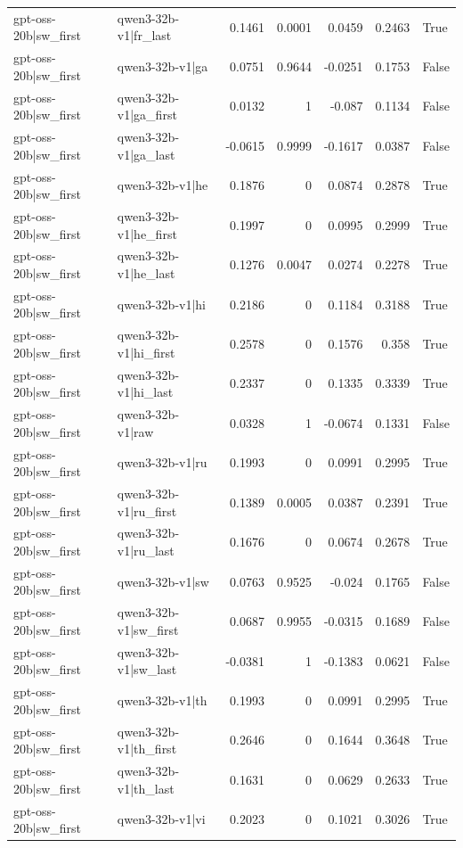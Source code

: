 \begin{table}
\begin{tabular}{l l r r r r l}
gpt-oss-20b|sw_first & qwen3-32b-v1|fr_last & 0.1461 & 0.0001 & 0.0459 & 0.2463 & True \\
gpt-oss-20b|sw_first & qwen3-32b-v1|ga & 0.0751 & 0.9644 & -0.0251 & 0.1753 & False \\
gpt-oss-20b|sw_first & qwen3-32b-v1|ga_first & 0.0132 & 1 & -0.087 & 0.1134 & False \\
gpt-oss-20b|sw_first & qwen3-32b-v1|ga_last & -0.0615 & 0.9999 & -0.1617 & 0.0387 & False \\
gpt-oss-20b|sw_first & qwen3-32b-v1|he & 0.1876 & 0 & 0.0874 & 0.2878 & True \\
gpt-oss-20b|sw_first & qwen3-32b-v1|he_first & 0.1997 & 0 & 0.0995 & 0.2999 & True \\
gpt-oss-20b|sw_first & qwen3-32b-v1|he_last & 0.1276 & 0.0047 & 0.0274 & 0.2278 & True \\
gpt-oss-20b|sw_first & qwen3-32b-v1|hi & 0.2186 & 0 & 0.1184 & 0.3188 & True \\
gpt-oss-20b|sw_first & qwen3-32b-v1|hi_first & 0.2578 & 0 & 0.1576 & 0.358 & True \\
gpt-oss-20b|sw_first & qwen3-32b-v1|hi_last & 0.2337 & 0 & 0.1335 & 0.3339 & True \\
gpt-oss-20b|sw_first & qwen3-32b-v1|raw & 0.0328 & 1 & -0.0674 & 0.1331 & False \\
gpt-oss-20b|sw_first & qwen3-32b-v1|ru & 0.1993 & 0 & 0.0991 & 0.2995 & True \\
gpt-oss-20b|sw_first & qwen3-32b-v1|ru_first & 0.1389 & 0.0005 & 0.0387 & 0.2391 & True \\
gpt-oss-20b|sw_first & qwen3-32b-v1|ru_last & 0.1676 & 0 & 0.0674 & 0.2678 & True \\
gpt-oss-20b|sw_first & qwen3-32b-v1|sw & 0.0763 & 0.9525 & -0.024 & 0.1765 & False \\
gpt-oss-20b|sw_first & qwen3-32b-v1|sw_first & 0.0687 & 0.9955 & -0.0315 & 0.1689 & False \\
gpt-oss-20b|sw_first & qwen3-32b-v1|sw_last & -0.0381 & 1 & -0.1383 & 0.0621 & False \\
gpt-oss-20b|sw_first & qwen3-32b-v1|th & 0.1993 & 0 & 0.0991 & 0.2995 & True \\
gpt-oss-20b|sw_first & qwen3-32b-v1|th_first & 0.2646 & 0 & 0.1644 & 0.3648 & True \\
gpt-oss-20b|sw_first & qwen3-32b-v1|th_last & 0.1631 & 0 & 0.0629 & 0.2633 & True \\
gpt-oss-20b|sw_first & qwen3-32b-v1|vi & 0.2023 & 0 & 0.1021 & 0.3026 & True \\

\end{tabular}
\end{table}
